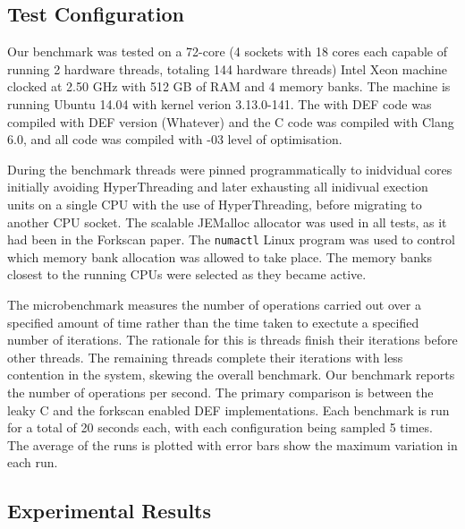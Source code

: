 \subsection{Test Configuration}

Our benchmark was tested on a 72-core (4 sockets with 18 cores each capable of running 2 hardware threads, totaling 144 hardware threads) Intel Xeon machine clocked at 2.50 GHz with 512 GB of RAM and 4 memory banks. The machine is running Ubuntu 14.04 with kernel verion 3.13.0-141. The with DEF code was compiled with DEF version (Whatever) and the C code was compiled with Clang 6.0, and all code was compiled with -03 level of optimisation.

During the benchmark threads were pinned programmatically to inidvidual cores initially avoiding HyperThreading and later exhausting all inidivual exection units on a single CPU with the use of HyperThreading, before migrating to another CPU socket. The scalable JEMalloc\cite{JEMalloc} allocator was used in all tests, as it had been in the Forkscan paper.\cite{Forkscan} The \texttt{numactl} Linux program was used to control which memory bank allocation was allowed to take place. The memory banks closest to the running CPUs were selected as they became active.

The microbenchmark measures the number of operations carried out over a specified amount of time rather than the time taken to exectute a specified number of iterations. The rationale for this is threads finish their iterations before other threads. The remaining threads complete their iterations with less contention in the system, skewing the overall benchmark. Our benchmark reports the number of operations per second. The primary comparison is between the leaky C and the forkscan enabled DEF implementations. Each benchmark is run for a total of 20 seconds each, with each configuration being sampled 5 times. The average of the runs is plotted with error bars show the maximum variation in each run.

\subsection{Experimental Results}

